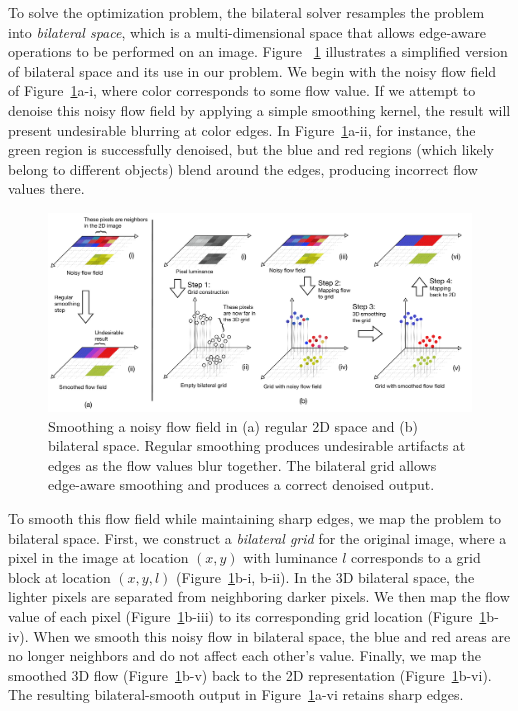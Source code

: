 To solve the optimization problem, the bilateral solver resamples the problem into \emph{bilateral space}, which is a multi-dimensional space that allows edge-aware operations to be performed on an image.
Figure ~\ref{fig:bilateral_grid_3d} illustrates a simplified version of bilateral space and its use in our problem.
We begin with the noisy flow field of Figure~\ref{fig:bilateral_grid_3d}a-i, where color corresponds to some flow value. 
If we attempt to denoise this noisy flow field by applying a simple smoothing kernel, the result will present undesirable blurring at color edges. 
In Figure~\ref{fig:bilateral_grid_3d}a-ii, for instance, the green region is successfully denoised, but the blue and red regions (which likely belong to different objects) blend around the edges, producing incorrect flow values there.

\begin{figure}[h]
  \includegraphics[width=.9\textwidth]{hfbs-figs/bilateral_grid_3d.pdf}
  \caption{Smoothing a noisy flow field in (a) regular 2D space and (b) bilateral space. Regular smoothing produces undesirable artifacts at edges as the flow values blur together. The bilateral grid allows edge-aware smoothing and produces a correct denoised output.}
  \label{fig:bilateral_grid_3d}
\end{figure}


To smooth this flow field while maintaining sharp edges, we map the problem to bilateral space. 
First, we construct a \emph{bilateral grid} for the original image, where a pixel in the image at location $(x,y)$ with luminance $l$ corresponds to a grid block at location $(x,y,l)$ (Figure~\ref{fig:bilateral_grid_3d}b-i, b-ii). 
In the 3D bilateral space, the lighter pixels are separated from neighboring darker pixels. 
We then map the flow value of each pixel (Figure~\ref{fig:bilateral_grid_3d}b-iii) to its corresponding grid location (Figure~\ref{fig:bilateral_grid_3d}b-iv).
When we smooth this noisy flow in bilateral space, the blue and red areas are no longer neighbors and do not affect each other's value. 
Finally, we map the smoothed 3D flow (Figure~\ref{fig:bilateral_grid_3d}b-v) back to the 2D representation (Figure~\ref{fig:bilateral_grid_3d}b-vi). 
The resulting  bilateral-smooth output in Figure~\ref{fig:bilateral_grid_3d}a-vi retains sharp edges.



